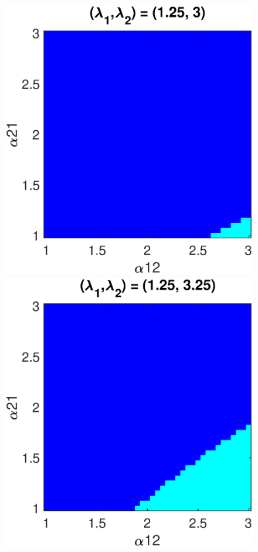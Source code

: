 \begin{figure}[h]
   \begin{minipage}{0.32\linewidth}
  \begin{center}
\includegraphics[width=1\linewidth]{Images/photo24_4.eps}
\end{center}
  \end{minipage} 
  \begin{minipage}{0.32\linewidth}
  \begin{center}
\includegraphics[width=1\linewidth]{Images/photo24_5.eps}
\end{center}


\end{minipage}
\end{figure}
